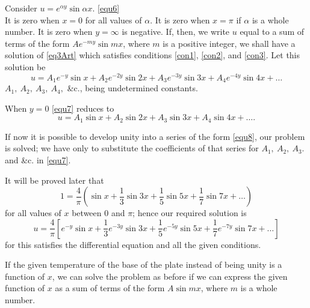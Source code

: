 \documentclass[oneside,12pt]{book}
\begin{document}
Consider \hfill $u=e^{\alpha y}\sin\alpha x.$ \hspace{6.1cm} \eqref{equ6} \\
It is zero when $x=0$ for all values of $\alpha$. It is zero when $x=\pi$ if $\alpha$ is a whole number. It is zero when $y=\infty$ is negative. If, then, we write $u$ equal to a sum of terms of the form $Ae^{-my}\sin mx$, where $m$ is a positive integer, we shall have a solution of \eqref{eq3Art} which satisfies conditions \eqref{con1}, \eqref{con2}, and \eqref{con3}. Let this solution be 
\begin{equation}
    u=A_1e^{-y}\sin x+A_2e^{-2y}\sin 2x+A_3e^{-3y}\sin 3x+A_4e^{-4y}\sin 4x+\dots 
    \label{equ7}
\end{equation}
$A_1,\ A_2,\ A_3,\ A_4,$ \&c., being undetermined constants. \par 

When $y=0$ \eqref{equ7} reduces to 
\begin{equation}
    u=A_1\sin x+A_2\sin 2x+A_3\sin 3x+A_4\sin 4x+\dots.
    \label{equ8}
\end{equation} \par 

If now it is possible to develop unity into a series of the form \eqref{equ8}, our problem is solved; we have only to substitute the coefficients of that series for $A_1,\ A_2,\ A_3$. and \&c. in \eqref{equ7}. \par 

It will be proved later that 
\begin{equation*}
    1=\frac{4}{\pi}\left(\sin x + \frac{1}{3}\sin 3x+ \frac{1}{5}\sin 5x+\frac{1}{7}\sin 7x+\dots\right)
\end{equation*}
for all values of $x$ between 0 and $\pi$; hence our required solution is 
\begin{equation}
    u=\frac{4}{\pi}\left[e^{-y}\sin x+\frac{1}{3}e^{-3y}\sin 3x+\frac{1}{5}e^{-5y}\sin 5x+\frac{1}{7}e^{-7y}\sin 7x+\dots\right]
    \label{equ9}
\end{equation}
for this satisfies the differential equation and all the given conditions. \par 

If the given temperature of the base of the plate instead of being unity is a function of $x$, we can solve the problem as before if we can express the given function of $x$ as a sum of terms of the form $A\sin mx$, where $m$ is a whole number. \par 
\end{document}
